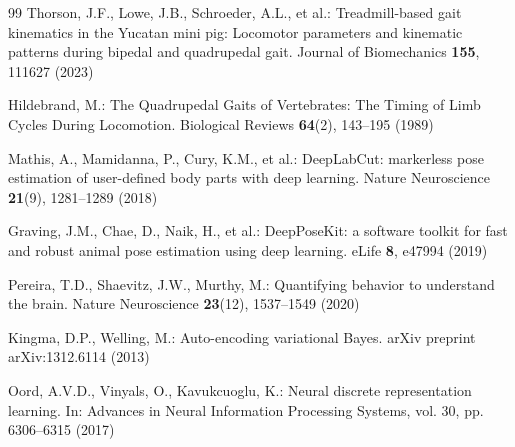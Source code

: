 \documentclass[runningheads]{llncs}
\begin{document}
\begin{thebibliography}{99}
Thorson, J.F., Lowe, J.B., Schroeder, A.L., et al.: Treadmill-based gait kinematics in the Yucatan mini pig: Locomotor parameters and kinematic patterns during bipedal and quadrupedal gait. Journal of Biomechanics \textbf{155}, 111627 (2023)

Hildebrand, M.: The Quadrupedal Gaits of Vertebrates: The Timing of Limb Cycles During Locomotion. Biological Reviews \textbf{64}(2), 143--195 (1989)

Mathis, A., Mamidanna, P., Cury, K.M., et al.: DeepLabCut: markerless pose estimation of user-defined body parts with deep learning. Nature Neuroscience \textbf{21}(9), 1281--1289 (2018)

Graving, J.M., Chae, D., Naik, H., et al.: DeepPoseKit: a software toolkit for fast and robust animal pose estimation using deep learning. eLife \textbf{8}, e47994 (2019)

Pereira, T.D., Shaevitz, J.W., Murthy, M.: Quantifying behavior to understand the brain. Nature Neuroscience \textbf{23}(12), 1537--1549 (2020)

Kingma, D.P., Welling, M.: Auto-encoding variational Bayes. arXiv preprint arXiv:1312.6114 (2013)

Oord, A.V.D., Vinyals, O., Kavukcuoglu, K.: Neural discrete representation learning. In: Advances in Neural Information Processing Systems, vol. 30, pp. 6306--6315 (2017)

\end{thebibliography}
\end{document}
